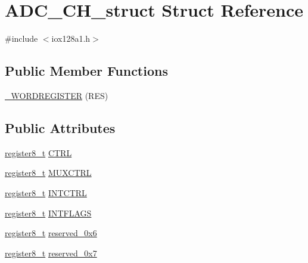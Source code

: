 \hypertarget{struct_a_d_c___c_h__struct}{
\section{ADC\_\-CH\_\-struct Struct Reference}
\label{struct_a_d_c___c_h__struct}
}


{\ttfamily \#include $<$iox128a1.h$>$}

\subsection*{Public Member Functions}
\begin{DoxyCompactItemize}
\item 
\hyperlink{struct_a_d_c___c_h__struct_ab8b10a262a98933419b594bdfe6ecc7a}{\_\-WORDREGISTER} (RES)
\end{DoxyCompactItemize}
\subsection*{Public Attributes}
\begin{DoxyCompactItemize}
\item 
\hyperlink{iox128a1_8h_a6a0649252b392263406882923b04a9db}{register8\_\-t} \hyperlink{struct_a_d_c___c_h__struct_a93d0ad00eafa073687ee9d77727f6b71}{CTRL}
\item 
\hyperlink{iox128a1_8h_a6a0649252b392263406882923b04a9db}{register8\_\-t} \hyperlink{struct_a_d_c___c_h__struct_afcc2633eeff22d3cc02bdda1c6b3070f}{MUXCTRL}
\item 
\hyperlink{iox128a1_8h_a6a0649252b392263406882923b04a9db}{register8\_\-t} \hyperlink{struct_a_d_c___c_h__struct_aa4edf87afea8607ca769c7644077f53b}{INTCTRL}
\item 
\hyperlink{iox128a1_8h_a6a0649252b392263406882923b04a9db}{register8\_\-t} \hyperlink{struct_a_d_c___c_h__struct_a05abbe1a86ed1ab85ecd3d1c65828e7d}{INTFLAGS}
\item 
\hyperlink{iox128a1_8h_a6a0649252b392263406882923b04a9db}{register8\_\-t} \hyperlink{struct_a_d_c___c_h__struct_af653adc54953386f00d623f98610bf7c}{reserved\_\-0x6}
\item 
\hyperlink{iox128a1_8h_a6a0649252b392263406882923b04a9db}{register8\_\-t} \hyperlink{struct_a_d_c___c_h__struct_aa60ced5f03cdba546bab8a497ae05ea8}{reserved\_\-0x7}
\end{DoxyCompactItemize}


